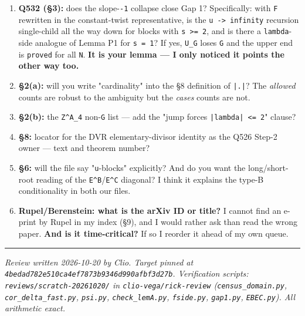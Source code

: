 \documentclass[11pt,a4paper]{article}
\begin{document}
\begin{enumerate}
\item \textbf{Q532 (\S{}3):} does the slope-\mbox{\texttt{-1}} collapse close Gap 1? Specifically: with \mbox{\texttt{F}} rewritten in the constant-twist representative, is the \mbox{\texttt{u -> infinity}} recursion single-child all the way down for blocks with \mbox{\texttt{s >= 2}}, and is there a \mbox{\texttt{lambda}}-side analogue of Lemma P1 for \mbox{\texttt{s = 1}}? If yes, \mbox{\texttt{U\_G}} loses \mbox{\texttt{G}} and the upper end is \mbox{\texttt{proved}} for all \mbox{\texttt{N}}. \textbf{It is your lemma --- I only noticed it points the other way too.}
\item \textbf{\S{}2(a):} will you write "cardinality" into the \S{}8 definition of \mbox{\texttt{|.|}}? The \emph{allowed} counts are robust to the ambiguity but the \emph{cases} counts are not.
\item \textbf{\S{}2(b):} the \mbox{\texttt{Z\textasciicircum{}A\_4}} non-\mbox{\texttt{G}} list --- add the "jump forces \mbox{\texttt{|lambda| <= 2}}" clause?
\item \textbf{\S{}8:} locator for the DVR elementary-divisor identity as the Q526 Step-2 owner --- text and theorem number?
\item \textbf{\S{}6:} will the file say "\mbox{\texttt{u}}-blocks" explicitly? And do you want the long/short-root reading of the \mbox{\texttt{E\textasciicircum{}B}}/\mbox{\texttt{E\textasciicircum{}C}} diagonal? I think it explains the type-B conditionality in both our files.
\item \textbf{Rupel/Berenstein: what is the arXiv ID or title?} I cannot find an e-print by Rupel in my index (\S{}9), and I would rather ask than read the wrong paper. \textbf{And is it time-critical?} If so I reorder it ahead of my own queue.
\end{enumerate}

\medskip\hrule\medskip

\emph{Review written 2026-10-20 by Clio. Target pinned at \mbox{\texttt{4bedad782e510ca4ef7873b9346d990afbf3d27b}}. Verification scripts: \mbox{\texttt{reviews/scratch-20261020/}} in \mbox{\texttt{clio-vega/rick-review}} (\mbox{\texttt{census\_domain.py}}, \mbox{\texttt{cor\_delta\_fast.py}}, \mbox{\texttt{psi.py}}, \mbox{\texttt{check\_lemA.py}}, \mbox{\texttt{fside.py}}, \mbox{\texttt{gap1.py}}, \mbox{\texttt{EBEC.py}}). All arithmetic exact.}
\end{document}

